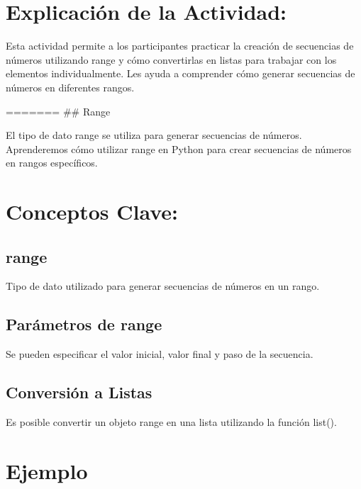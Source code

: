 \documentclass[
  a4paper,
  onepage,
  openany]{scrreprt}
\begin{document}
\hypertarget{explicaciuxf3n-de-la-actividad-20}{%
\section{Explicación de la
Actividad:}\label{explicaciuxf3n-de-la-actividad-20}}

Esta actividad permite a los participantes practicar la creación de
secuencias de números utilizando range y cómo convertirlas en listas
para trabajar con los elementos individualmente. Les ayuda a comprender
cómo generar secuencias de números en diferentes rangos.

======= \#\# Range

El tipo de dato range se utiliza para generar secuencias de números.
Aprenderemos cómo utilizar range en Python para crear secuencias de
números en rangos específicos.

\hypertarget{conceptos-clave-23}{%
\section{Conceptos Clave:}\label{conceptos-clave-23}}

\hypertarget{range-2}{%
\subsection{range}\label{range-2}}

Tipo de dato utilizado para generar secuencias de números en un rango.

\hypertarget{paruxe1metros-de-range-1}{%
\subsection{Parámetros de range}\label{paruxe1metros-de-range-1}}

Se pueden especificar el valor inicial, valor final y paso de la
secuencia.

\hypertarget{conversiuxf3n-a-listas-1}{%
\subsection{Conversión a Listas}\label{conversiuxf3n-a-listas-1}}

Es posible convertir un objeto range en una lista utilizando la función
list().

\hypertarget{ejemplo-23}{%
\section{Ejemplo}\label{ejemplo-23}}
\end{document}
